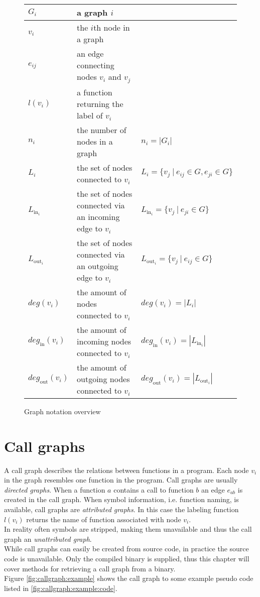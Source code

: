 \documentclass[
    12pt,                               %
    DIV=14,                     %
    parskip=half+,              %
    bigheadings,                %
    cleardoubleempty,   %
    halfparskip,                %
    ]{scrreprt} %
\begin{document}
\begin{figure}[H]
	\centering
	\begin{tabular}{l | l | l}
		$G_i$		& a graph $i$ & \\ \hline
		$v_i$		& the $i$th node in a graph \\ \hline
		$e_{ij}$	& an edge connecting nodes $v_i$ and $v_j$ \\ \hline
		$l(v_i)$	& a function returning the label of $v_i$ & \\ \hline
		$n_i$		& the number of nodes in a graph & $n_i = |G_i|$ \\ \hline
		$L_i$		& the set of nodes connected to $v_i$ & $L_i = \{v_j \: | \: e_{ij} \in G, e_{ji} \in G\}$ \\ \hline
		$L_{\text{in}_i}$ & the set of nodes connected via an incoming edge to $v_i$ & $L_{\text{in}_i} = \{v_j \: | \: e_{ji} \in G\}$ \\ \hline
		$L_{\text{out}_i}$ & the set of nodes connected via an outgoing edge to $v_i$ & $L_{\text{out}_i} = \{v_j \: | \: e_{ij} \in G\}$ \\ \hline
		$deg(v_i)$	& the amount of nodes connected to $v_i$ & $deg(v_i) = |L_i|$ \\ \hline
		$deg_{\text{in}}(v_i)$	& the amount of incoming nodes connected to $v_i$ & $deg_{\text{in}}(v_i) = |L_{\text{in}_i}|$ \\ \hline
		$deg_{\text{out}}(v_i)$	& the amount of outgoing nodes connected to $v_i$ & $deg_{\text{out}}(v_i) = |L_{\text{out}_i}|$ \\
	\end{tabular}
	\caption{Graph notation overview}
	\label{fig:notation}
\end{figure}

\chapter{Call graphs} \label{chap:graphacquisition}
A call graph describes the relations between functions in a program. Each node $v_i$ in the graph resembles one function in the program. Call graphs are usually \textit{directed graphs}. When a function $a$ contains a call to function $b$ an edge $e_{ab}$ is created in the call graph. When symbol information, i.e. function naming, is available, call graphs are \textit{attributed graphs}. In this case the labeling function $l(v_i)$ returns the name of function associated with node $v_i$. \\
In reality often symbols are stripped, making them unavailable and thus the call graph an \textit{unattributed graph}. \\
While call graphs can easily be created from source code, in practice the source code is unavailable. Only the compiled binary is supplied, thus this chapter will cover methods for retrieving a call graph from a binary. \\
Figure \ref{fig:callgraph:example} shows the call graph to some example pseudo code listed in \ref{fig:callgraph:example:code}.
\end{document}
